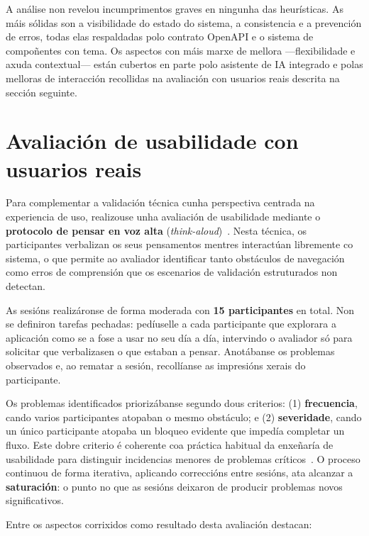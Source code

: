 A análise non revelou incumprimentos graves en ningunha das heurísticas. As máis sólidas
son a visibilidade do estado do sistema, a consistencia e a prevención de erros, todas
elas respaldadas polo contrato OpenAPI e o sistema de compoñentes con tema. Os aspectos
con máis marxe de mellora —flexibilidade e axuda contextual— están cubertos en parte polo
asistente de IA integrado e polas melloras de interacción recollidas na avaliación con
usuarios reais descrita na sección seguinte.

\section{Avaliación de usabilidade con usuarios reais}
\label{sec:usabilidade}

Para complementar a validación técnica cunha perspectiva centrada na experiencia de uso,
realizouse unha avaliación de usabilidade mediante o \textbf{protocolo de pensar en voz
alta} (\textit{think-aloud})~\cite{nielsen1994usability}. Nesta técnica, os participantes
verbalizan os seus pensamentos mentres interactúan libremente co sistema, o que permite ao
avaliador identificar tanto obstáculos de navegación como erros de comprensión que os
escenarios de validación estruturados non detectan.

As sesións realizáronse de forma moderada con \textbf{15 participantes} en total. Non se
definiron tarefas pechadas: pedíuselle a cada participante que explorara a aplicación como
se a fose a usar no seu día a día, intervindo o avaliador só para solicitar que
verbalizasen o que estaban a pensar. Anotábanse os problemas observados e, ao rematar a
sesión, recollíanse as impresións xerais do participante.

Os problemas identificados priorizábanse segundo dous criterios: (1) \textbf{frecuencia},
cando varios participantes atopaban o mesmo obstáculo; e (2) \textbf{severidade}, cando un
único participante atopaba un bloqueo evidente que impedía completar un fluxo. Este dobre
criterio é coherente coa práctica habitual da enxeñaría de usabilidade para distinguir
incidencias menores de problemas críticos~\cite{nielsen1994usability}. O proceso continuou
de forma iterativa, aplicando correccións entre sesións, ata alcanzar a
\textbf{saturación}: o punto no que as sesións deixaron de producir problemas novos
significativos.

Entre os aspectos corrixidos como resultado desta avaliación destacan:

